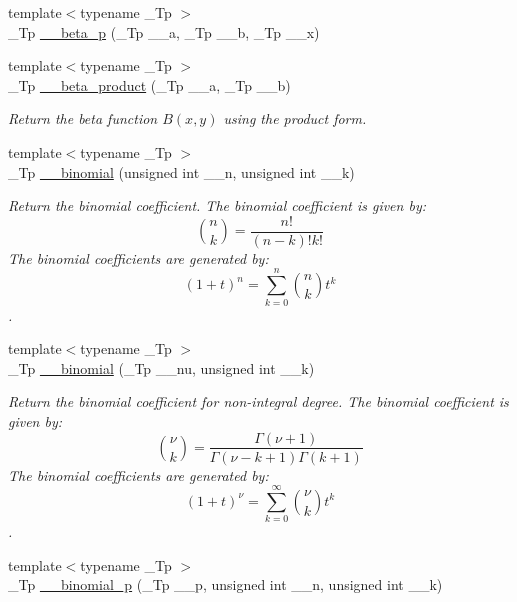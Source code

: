 \begin{DoxyCompactItemize}
{\footnotesize template$<$typename \+\_\+\+Tp $>$ }\\\+\_\+\+Tp \hyperlink{namespacestd_1_1____detail_ae1ebc99ce7ff6bf261b519ab293f4fd6}{\+\_\+\+\_\+beta\+\_\+p} (\+\_\+\+Tp \+\_\+\+\_\+a, \+\_\+\+Tp \+\_\+\+\_\+b, \+\_\+\+Tp \+\_\+\+\_\+x)
\item 
{\footnotesize template$<$typename \+\_\+\+Tp $>$ }\\\+\_\+\+Tp \hyperlink{namespacestd_1_1____detail_a9baa688a27befab7fa48ccfb4a87a9ca}{\+\_\+\+\_\+beta\+\_\+product} (\+\_\+\+Tp \+\_\+\+\_\+a, \+\_\+\+Tp \+\_\+\+\_\+b)
\begin{DoxyCompactList}\small\item\em Return the beta function $B(x,y)$ using the product form. \end{DoxyCompactList}\item 
{\footnotesize template$<$typename \+\_\+\+Tp $>$ }\\\+\_\+\+Tp \hyperlink{namespacestd_1_1____detail_a4483574682ad034be17c75ef29892b02}{\+\_\+\+\_\+binomial} (unsigned int \+\_\+\+\_\+n, unsigned int \+\_\+\+\_\+k)
\begin{DoxyCompactList}\small\item\em Return the binomial coefficient. The binomial coefficient is given by\+: \[ \binom{n}{k} = \frac{n!}{(n-k)! k!} \] The binomial coefficients are generated by\+: \[ \left(1 + t\right)^n = \sum_{k=0}^n \binom{n}{k} t^k \]. \end{DoxyCompactList}\item 
{\footnotesize template$<$typename \+\_\+\+Tp $>$ }\\\+\_\+\+Tp \hyperlink{namespacestd_1_1____detail_a9ac7d44eebfe3e1a3fb5ebbd9c08bd55}{\+\_\+\+\_\+binomial} (\+\_\+\+Tp \+\_\+\+\_\+nu, unsigned int \+\_\+\+\_\+k)
\begin{DoxyCompactList}\small\item\em Return the binomial coefficient for non-\/integral degree. The binomial coefficient is given by\+: \[ \binom{\nu}{k} = \frac{\Gamma(\nu+1)}{\Gamma(\nu-k+1) \Gamma(k+1)} \] The binomial coefficients are generated by\+: \[ \left(1 + t\right)^\nu = \sum_{k=0}^\infty \binom{\nu}{k} t^k \]. \end{DoxyCompactList}\item 
{\footnotesize template$<$typename \+\_\+\+Tp $>$ }\\\+\_\+\+Tp \hyperlink{namespacestd_1_1____detail_a6efd57f8f3b9ea42df29de116db6081b}{\+\_\+\+\_\+binomial\+\_\+p} (\+\_\+\+Tp \+\_\+\+\_\+p, unsigned int \+\_\+\+\_\+n, unsigned int \+\_\+\+\_\+k)

\end{DoxyCompactItemize}
